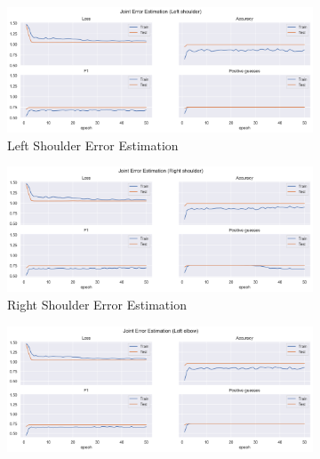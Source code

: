   
  \begin{figure}[!ht]
    \centering
    \begin{subfigure}[b]{0.47\linewidth}
        \centering
        \includegraphics[width=\textwidth]{figures/Results/v2/jt/Left shoulder_ErrorEstimation.png}
        \caption{Left Shoulder Error Estimation}
        \label{fig:v2_lesh_jt_ee}
    \end{subfigure}
    \hfill
    \begin{subfigure}[b]{0.47\linewidth}
        \centering
        \includegraphics[width=\textwidth]{figures/Results/v2/jt/Right shoulder_ErrorEstimation.png}
        \caption{Right Shoulder Error Estimation}
        \label{fig:v2_rish_jt_ee}
    \end{subfigure}
    \hfill
    \begin{subfigure}[b]{0.47\linewidth}
        \centering
        \includegraphics[width=\textwidth]{figures/Results/v2/jt/Left ebpow_ErrorEstimation.png}

\end{subfigure}
\end{figure}

